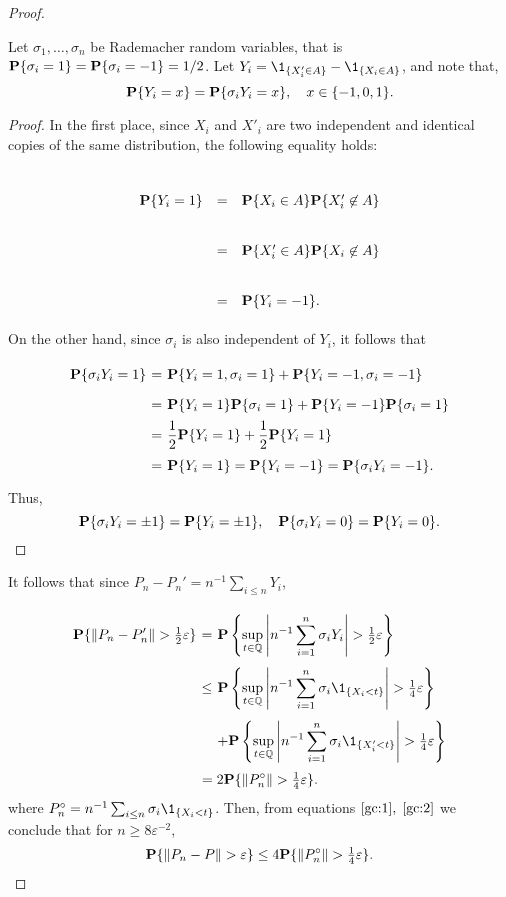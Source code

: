\begin{proof}
  \begin{lemma}\label{gc:l2}
    Let $\sigma_1, \ldots, \sigma_n$ be Rademacher random variables, that is $\P\{\sigma_i = 1\} = \P\{\sigma_i = -1\} = 1/2$. Let $Y_i = \1_{\{ X_i' \in A\}} - \1_{\{ X_i \in A\}}$, and note that,
    \[ \P\{Y_i = x\} = \P\{\sigma_i Y_i = x\},\hspace*{1em} x \in \{-1,0,1\}. \] 
  \end{lemma}

  \begin{proof} In the first place, since $X_i$ and $X'_i$ are two independent and identical copies of the same distribution, the following equality holds: 

    \[ \begin{array}{rcl}
      \P\{Y_i = 1\} & = & \P\{X_i \in A\} \P\{X'_i \not\in A\}\\
      & = &  \P\{X'_i \in A\} \P\{X_i \not\in A\}\\
      & = & \P\{Y_i = -1\}.
    \end{array} \]
  On the other hand, since $\sigma_i$ is also independent of $Y_i$, it follows that
  \[ \everymath{\displaystyle}\arraycolsep=1.8pt\def\arraystretch{1.8}
  \begin{array}{rcl}
    \P\{\sigma_i Y_i = 1\} & = & \P\{Y_i = 1, \sigma_i = 1\} + \P\{Y_i = -1, \sigma_i = -1\}\\
    & = & \P\{Y_i = 1\} \P\{\sigma_i = 1\} + \P\{Y_i = -1\} \P\{\sigma_i = 1\}\\
    & = & \frac{1}{2} \P\{Y_i = 1\} + \frac{1}{2} \P\{Y_i = 1\}\\
    & = & \P\{Y_i = 1\} = \P\{Y_i = -1\} = \P\{\sigma_i Y_i = -1\}.
  \end{array}
    \]
    Thus,
    \[  \P\{\sigma_i Y_i = \pm 1\} = \P\{Y_i = \pm 1\},\hspace*{1em}  \P\{\sigma_i Y_i = 0\} = \P\{ Y_i = 0\}. \] 
  \end{proof}
  
  It follows that since $P_n - P_n' = n^{-1} \sum_{i \leq n} Y_i$,
  \begin{equation}
    \label{gc:2} 
    \everymath{\displaystyle}\arraycolsep=1.8pt\def\arraystretch{3}
  \begin{array}{rcl}
    \P\{\|P_n - P_n'\| > \tfrac{1}{2}\varepsilon\} & = & \P\left\{\sup_{t\in \Q} \left|n^{-1}\sum_{i = 1}^n \sigma_i Y_i\right| >\tfrac{1}{2}\varepsilon \right\}\\
    & \leq & \P\left\{\sup_{t\in \Q} \left|n^{-1}\sum_{i = 1}^n \sigma_i\1_{\{ X_i < t\}}\right| >\tfrac{1}{4}\varepsilon \right\}\\
    & & + \P\left\{\sup_{t\in \Q} \left|n^{-1}\sum_{i = 1}^n \sigma_i\1_{\{ X_i' < t\}}\right| >\tfrac{1}{4}\varepsilon \right\}
  \end{array}
  \end{equation}
  \[ = 2\P\{\|P_n^\circ\| > \tfrac{1}{4} \varepsilon\}.  \] 
  where $P_n^\circ = n^{-1}\sum_{i\leq n} \sigma_i \1_{\{ X_i < t\}}$. Then, from equations $\ref{gc:1},\;\ref{gc:2}$ we conclude that for $n \geq 8\varepsilon^{-2}$,
  \[ \P\{\|P_n-P\| > \varepsilon\} \leq 4 \P\{\|P_n^\circ\|> \tfrac{1}{4}\varepsilon\}.\]


\end{proof}
